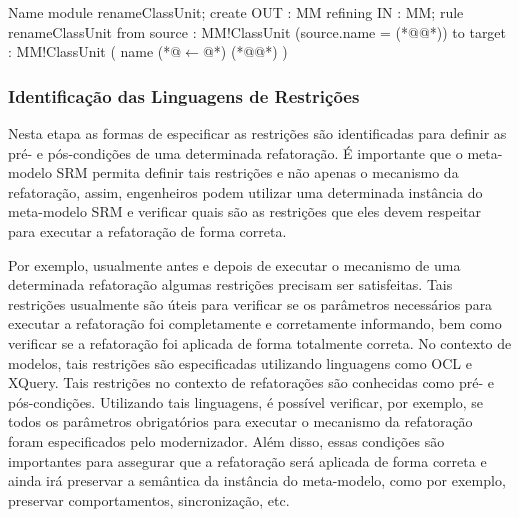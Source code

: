 \begin{codigo}[caption={[Refatoração \textit{Rename ClassUnit}.] Refatoração \textit{Rename ClassUnit}.},escapeinside={(*@}{@*)}, basicstyle=\footnotesize, label={codigo:rename_classUnit_SRM}, language=ATL]{Name}
module renameClassUnit;
create OUT : MM refining IN : MM;
rule renameClassUnit {
	from
		source : MM!ClassUnit (source.name = (*@@*))
	to 
		target : MM!ClassUnit (
			name (*@$\leftarrow$@*) (*@@*)
		)
}
\end{codigo}




\subsubsection{Identificação das Linguagens de Restrições}
Nesta etapa as formas de especificar as restrições são identificadas para definir as pré- e pós-condições de uma determinada refatoração. É importante que o meta-modelo SRM permita definir tais restrições e não apenas o mecanismo da refatoração, assim, engenheiros podem utilizar uma determinada instância do meta-modelo SRM e verificar quais são as restrições que eles devem respeitar para executar a refatoração de forma correta. 

Por exemplo, usualmente antes e depois de executar o mecanismo de uma determinada refatoração algumas restrições precisam ser satisfeitas. Tais restrições usualmente são úteis para verificar se os parâmetros necessários para executar a refatoração foi completamente e corretamente informando, bem como verificar se a refatoração foi aplicada de forma totalmente correta. No contexto de modelos, tais restrições são especificadas utilizando linguagens como OCL e XQuery. Tais restrições no contexto de refatorações são conhecidas como pré- e pós-condições. Utilizando tais linguagens, é possível verificar, por exemplo, se todos os parâmetros obrigatórios para executar o mecanismo da refatoração foram especificados pelo modernizador. Além disso, essas condições são importantes para assegurar que a refatoração será aplicada de forma correta e ainda irá preservar a semântica da instância do meta-modelo, como por exemplo, preservar comportamentos, sincronização, etc. 

